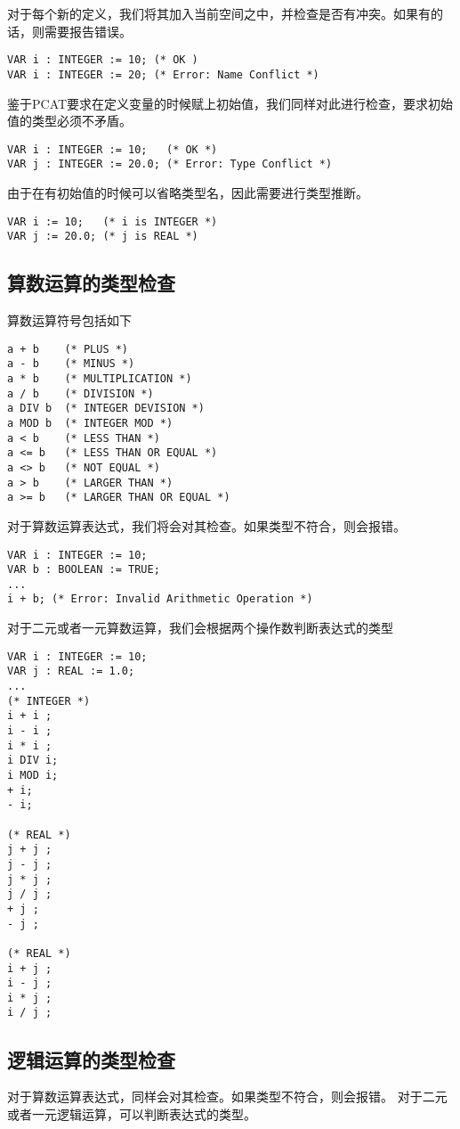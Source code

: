 ﻿\documentclass{article}
\begin{document}
对于每个新的定义，我们将其加入当前空间之中，并检查是否有冲突。如果有的话，则需要报告错误。
\begin{lstlisting}
VAR i : INTEGER := 10; (* OK )
VAR i : INTEGER := 20; (* Error: Name Conflict *)
\end{lstlisting}

鉴于PCAT要求在定义变量的时候赋上初始值，我们同样对此进行检查，要求初始值的类型必须不矛盾。
\begin{lstlisting}
VAR i : INTEGER := 10;   (* OK *)
VAR j : INTEGER := 20.0; (* Error: Type Conflict *)
\end{lstlisting}

由于在有初始值的时候可以省略类型名，因此需要进行类型推断。
\begin{lstlisting}
VAR i := 10;   (* i is INTEGER *)
VAR j := 20.0; (* j is REAL *)
\end{lstlisting}

\subsection{算数运算的类型检查}

算数运算符号包括如下
\begin{lstlisting}
a + b    (* PLUS *)
a - b    (* MINUS *)
a * b    (* MULTIPLICATION *)
a / b    (* DIVISION *)
a DIV b  (* INTEGER DEVISION *)
a MOD b  (* INTEGER MOD *)
a < b    (* LESS THAN *)
a <= b   (* LESS THAN OR EQUAL *)
a <> b   (* NOT EQUAL *)
a > b    (* LARGER THAN *)
a >= b   (* LARGER THAN OR EQUAL *)
\end{lstlisting}


对于算数运算表达式，我们将会对其检查。如果类型不符合，则会报错。
\begin{lstlisting}
VAR i : INTEGER := 10;
VAR b : BOOLEAN := TRUE;
...
i + b; (* Error: Invalid Arithmetic Operation *)
\end{lstlisting}

对于二元或者一元算数运算，我们会根据两个操作数判断表达式的类型
\begin{lstlisting}
VAR i : INTEGER := 10;
VAR j : REAL := 1.0;
...
(* INTEGER *)
i + i ; 
i - i ; 
i * i ; 
i DIV i; 
i MOD i;
+ i;
- i;

(* REAL *)
j + j ; 
j - j ; 
j * j ; 
j / j ; 
+ j ; 
- j ; 

(* REAL *)
i + j ; 
i - j ; 
i * j ; 
i / j ; 
\end{lstlisting}

\subsection{逻辑运算的类型检查}
对于算数运算表达式，同样会对其检查。如果类型不符合，则会报错。
对于二元或者一元逻辑运算，可以判断表达式的类型。
\end{document}
